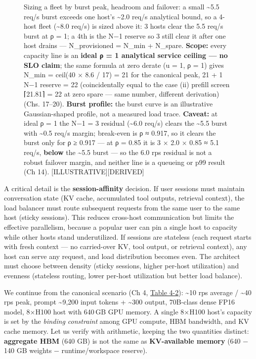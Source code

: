 \begin{figure}
\caption[Sizing a fleet by burst peak, headroom and failover]{Sizing a fleet by burst peak, headroom and failover: a small \textasciitilde5.5 req/s burst exceeds one host's \textasciitilde2.0 req/s analytical bound, so a 4-host fleet (\textasciitilde8.0 req/s) is sized above it: 3 hosts clear the 5.5 req/s burst at ρ = 1; a 4th is the N−1 reserve so 3 still clear it after one host drains --- N\_provisioned = N\_min + N\_spare. \textbf{Scope:} every capacity line is an \textbf{ideal ρ = 1 analytical service ceiling --- no SLO claim}; the same formula at zero derate (u = 1, ρ = 1) gives N\_min = ceil(40 × 8.6 / 17) = 21 for the canonical peak, 21 + 1 N−1 reserve = 22 (coincidentally equal to the case (ii) prefill screen ⌈21.81⌉ = 22 at zero spare --- same number, different derivation) (Chs. 17--20). \textbf{Burst profile:} the burst curve is an illustrative Gaussian-shaped profile, not a measured load trace. \textbf{Caveat:} at ideal ρ = 1 the N−1 = 3 residual (\textasciitilde6.0 req/s) clears the \textasciitilde5.5 burst with \textasciitilde0.5 req/s margin; break-even is ρ ≈ 0.917, so it clears the burst only for ρ ≥ 0.917 --- at ρ = 0.85 it is 3 × 2.0 × 0.85 ≈ 5.1 req/s, \textbf{below} the \textasciitilde5.5 burst --- so the 6.0 rps residual is not a robust failover margin, and neither line is a queueing or p99 result (Ch 14). \mbox{{[}ILLUSTRATIVE{]}}\hspace{0pt}\mbox{{[}DERIVED{]}}}

\label{fig:17.1}\end{figure}

A critical detail is the \textbf{session-affinity} decision. If user
sessions must maintain conversation state (KV cache, accumulated tool
outputs, retrieval context), the load balancer must route subsequent
requests from the same user to the same host (sticky sessions). This
reduces cross-host communication but limits the effective parallelism,
because a popular user can pin a single host to capacity while other
hosts stand underutilized. If sessions are stateless (each request
starts with fresh context --- no carried-over KV, tool output, or
retrieval context), any host can serve any request, and load
distribution becomes even. The architect must choose between density
(sticky sessions, higher per-host utilization) and evenness (stateless
routing, lower per-host utilization but better load balance).

\label{worked-example}


We continue from the canonical scenario (Ch 4, \hyperref[tab:4.2]{Table 4-2}):
\textasciitilde10 rps average / \textasciitilde40 rps peak, prompt
\textasciitilde9,200 input tokens + \textasciitilde300 output, 70B-class
dense FP16 model, 8×H100 host with 640\,GB GPU memory. A single 8×H100
host's capacity is set by the \emph{binding constraint} among GPU
compute, HBM bandwidth, and KV cache memory. Let us verify with
arithmetic, keeping the two quantities distinct: \textbf{aggregate HBM}
(640 GB) is not the same as \textbf{KV-available memory} (640 − 140 GB
weights − runtime/workspace reserve).

